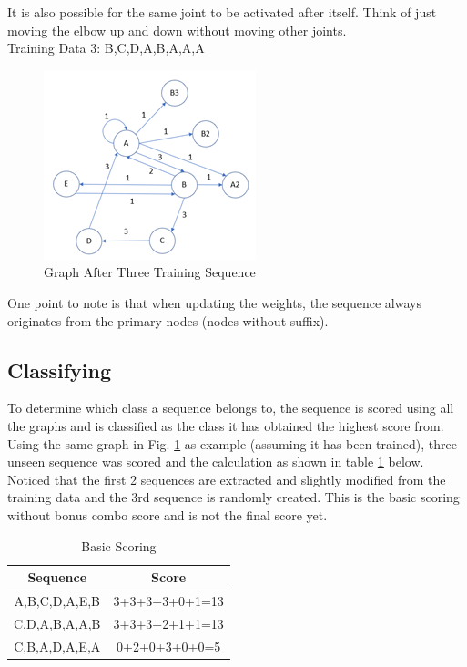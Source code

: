 \documentclass[conference]{IEEEtran}
\begin{document}
It is also possible for the same joint to be activated after itself. Think of just moving the elbow up and down without moving other joints. \\

Training Data 3: B,C,D,A,B,A,A,A

\begin{figure}[H]
\begin{center}
\includegraphics[scale=1]{Image/Graph3.png}
\caption{\label{fig:Graph3} Graph After Three Training Sequence}
\end{center}
\end{figure}

One point to note is that when updating the weights, the sequence always originates from the primary nodes (nodes without suffix). 

\subsection{Classifying }

To determine which class a sequence belongs to, the sequence is scored using all the graphs and is classified as the class it has obtained the highest score from. Using the same graph in Fig. \ref{fig:Graph3} as example (assuming it has been trained), three unseen sequence was scored and the calculation as shown in table \ref{tbl:basic_score} below. Noticed that the first 2 sequences are extracted and slightly modified from the training data and the 3rd sequence is randomly created. This is the basic scoring without bonus combo score and is not the final score yet. 

\begin{table}[H] 
\begin{center}
\caption{Basic Scoring} \label{tbl:basic_score}
\begin{tabular}{|c|c|}
\hline
Sequence & Score \\
\hline
A,B,C,D,A,E,B  & 3+3+3+3+0+1=13  \\
\hline
C,D,A,B,A,A,B & 3+3+3+2+1+1=13  \\
\hline
C,B,A,D,A,E,A & 0+2+0+3+0+0=5  \\
\hline
\end{tabular}
\end{center}
\end{table}
\end{document}
